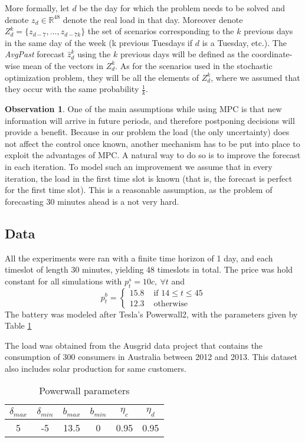 \documentclass[11pt]{article}
\theoremstyle{definition}
\newtheorem{observation}[thm]{\textbf{Observation}}
\begin{document}
More formally, let $d$ be the day for which the problem needs to be solved and denote $z_d \in \mathbb{R}^{48}$ denote the real load in that day. Moreover denote $Z^k_d = \{ z_{d - 7}, \dots, z_{d - 7k}\}$ the set of scenarios corresponding to the $k$ previous days in the same day of the week (k previous Tuesdays if $d$ is a Tuesday, etc.).
The \textit{AvgPast} forecast $\hat{z}^k_d$ using the $k$ previous days will be defined as the coordinate-wise mean of the vectors in $Z^k_d$. As for the scenarios used in the stochastic optimization problem, they will be all the elements of $Z^k_d$, where we assumed that they occur with the same probability $\frac{1}{k}$.

\begin{observation}
	One of the main assumptions while using MPC is that new information will arrive in future periods, and therefore postponing decisions will provide a benefit. Because in our problem the load (the only uncertainty) does not affect the control once known, another mechanism has to be put into place to exploit the advantages of MPC. A natural way to do so is to improve the forecast in each iteration. To model such an improvement we assume that in every iteration, the load in the first time slot is known (that is, the forecast is perfect for the first time slot). This is a reasonable assumption, as the problem of forecasting 30 minutes ahead is a not very hard.	
\end{observation}

\subsection{Data}
All the experiments were ran with a finite time horizon of 1 day, and each timeslot of length 30 minutes, yielding 48 timeslots in total. The price was hold constant for all simulations with $p^s_t = 10c, \ \forall t$ and $$p^b_t = \begin{cases} 15.8 & \text{ if } 14\leq t \leq 45 \\ 12.3 & \text{ otherwise} \end{cases}$$
The battery was modeled after Tesla's Powerwall2, with the parameters given by Table \ref{tab:powerwall}

The load was obtained from the Ausgrid data project \cite{dataset} that contains the consumption of 300 consumers in Australia between 2012 and 2013. This dataset also includes solar production for same customers. 

\begin{table}[htpb]
  \centering
  \caption{Powerwall parameters}
  \label{tab:powerwall}
  \begin{tabular}{|c|c|c|c|c|c|}
    \hline
    $\delta_{max}$ & $\delta_{min}$ & $b_{max}$  & $b_{min}$ & $\eta_c$
                   & $\eta_d$ \\
    \hline
    5 & -5 & 13.5 & 0 & 0.95 & 0.95 \\
    \hline
  \end{tabular}
\end{table}
\end{document}

